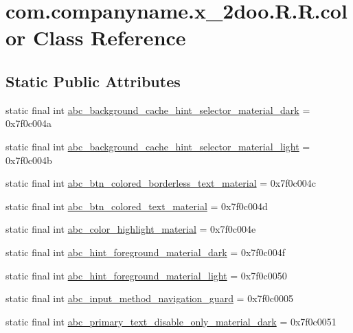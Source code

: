 \hypertarget{classcom_1_1companyname_1_1x__2doo_1_1_r_1_1color}{
\section{com.companyname.x\_\-2doo.R.R.color Class Reference}
\label{classcom_1_1companyname_1_1x__2doo_1_1_r_1_1color}
}
\subsection*{Static Public Attributes}
\begin{CompactItemize}
\item 
static final int \hyperlink{classcom_1_1companyname_1_1x__2doo_1_1_r_1_1color_947ab14ec7582552b0a01fddaf4a4421}{abc\_\-background\_\-cache\_\-hint\_\-selector\_\-material\_\-dark} = 0x7f0c004a
\item 
static final int \hyperlink{classcom_1_1companyname_1_1x__2doo_1_1_r_1_1color_41ed536f1d8873430a2004779870f0f1}{abc\_\-background\_\-cache\_\-hint\_\-selector\_\-material\_\-light} = 0x7f0c004b
\item 
static final int \hyperlink{classcom_1_1companyname_1_1x__2doo_1_1_r_1_1color_4a83d203968dbc3c6250aec79a168d28}{abc\_\-btn\_\-colored\_\-borderless\_\-text\_\-material} = 0x7f0c004c
\item 
static final int \hyperlink{classcom_1_1companyname_1_1x__2doo_1_1_r_1_1color_cbbd15edbac4c4dfe6fe7082d5ba2b7d}{abc\_\-btn\_\-colored\_\-text\_\-material} = 0x7f0c004d
\item 
static final int \hyperlink{classcom_1_1companyname_1_1x__2doo_1_1_r_1_1color_9d130104445ac29b31c312bd5f19cd11}{abc\_\-color\_\-highlight\_\-material} = 0x7f0c004e
\item 
static final int \hyperlink{classcom_1_1companyname_1_1x__2doo_1_1_r_1_1color_18f08f0344c3d538ec273027bad90166}{abc\_\-hint\_\-foreground\_\-material\_\-dark} = 0x7f0c004f
\item 
static final int \hyperlink{classcom_1_1companyname_1_1x__2doo_1_1_r_1_1color_5e489561244cb6ff6af2cdfa73072937}{abc\_\-hint\_\-foreground\_\-material\_\-light} = 0x7f0c0050
\item 
static final int \hyperlink{classcom_1_1companyname_1_1x__2doo_1_1_r_1_1color_1df5750c54912c5142ac2206c2f14793}{abc\_\-input\_\-method\_\-navigation\_\-guard} = 0x7f0c0005
\item 
static final int \hyperlink{classcom_1_1companyname_1_1x__2doo_1_1_r_1_1color_26acba783d17b8e17cb06fcbf1a6416f}{abc\_\-primary\_\-text\_\-disable\_\-only\_\-material\_\-dark} = 0x7f0c0051

\end{CompactItemize}
